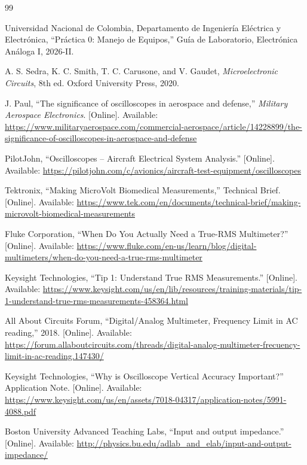 \documentclass[journal, a4paper]{IEEEtran}
\begin{document}
\renewcommand{\refname}{Referencias}
\begin{thebibliography}{99}

Universidad Nacional de Colombia, Departamento de Ingeniería Eléctrica y Electrónica, ``Práctica 0: Manejo de Equipos,'' Guía de Laboratorio, Electrónica Análoga I, 2026-II.

A. S. Sedra, K. C. Smith, T. C. Carusone, and V. Gaudet, \textit{Microelectronic Circuits}, 8th ed. Oxford University Press, 2020.

J. Paul, ``The significance of oscilloscopes in aerospace and defense,'' \textit{Military Aerospace Electronics}. [Online]. Available: \url{https://www.militaryaerospace.com/commercial-aerospace/article/14228899/the-significance-of-oscilloscopes-in-aerospace-and-defense}

PilotJohn, ``Oscilloscopes -- Aircraft Electrical System Analysis.'' [Online]. Available: \url{https://pilotjohn.com/c/avionics/aircraft-test-equipment/oscilloscopes}

Tektronix, ``Making MicroVolt Biomedical Measurements,'' Technical Brief. [Online]. Available: \url{https://www.tek.com/en/documents/technical-brief/making-microvolt-biomedical-measurements}

Fluke Corporation, ``When Do You Actually Need a True-RMS Multimeter?'' [Online]. Available: \url{https://www.fluke.com/en-us/learn/blog/digital-multimeters/when-do-you-need-a-true-rms-multimeter}

Keysight Technologies, ``Tip 1: Understand True RMS Measurements.'' [Online]. Available: \url{https://www.keysight.com/us/en/lib/resources/training-materials/tip-1-understand-true-rms-measurements-458364.html}

All About Circuits Forum, ``Digital/Analog Multimeter, Frequency Limit in AC reading,'' 2018. [Online]. Available: \url{https://forum.allaboutcircuits.com/threads/digital-analog-multimeter-frecuency-limit-in-ac-reading.147430/}

Keysight Technologies, ``Why is Oscilloscope Vertical Accuracy Important?'' Application Note. [Online]. Available: \url{https://www.keysight.com/us/en/assets/7018-04317/application-notes/5991-4088.pdf}

Boston University Advanced Teaching Labs, ``Input and output impedance.'' [Online]. Available: \url{http://physics.bu.edu/adlab_and_elab/input-and-output-impedance/}

\end{thebibliography}
\end{document}
